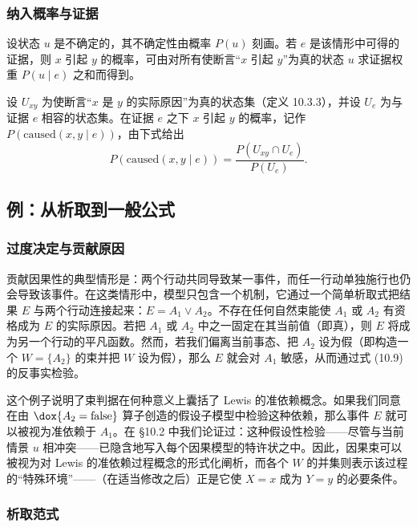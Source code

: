 \subsubsection*{纳入概率与证据}

设状态 $u$ 是不确定的，其不确定性由概率 $P(u)$ 刻画。若 $e$ 是该情形中可得的证据，则 $x$ 引起 $y$ 的概率，可由对所有使断言“$x$ 引起 $y$”为真的状态 $u$ 求证据权重 $P(u\mid e)$ 之和而得到。

\begin{definition}[实际因果性的概率]
设 $U_{xy}$ 为使断言“$x$ 是 $y$ 的实际原因”为真的状态集（定义 10.3.3），并设 $U_e$ 为与证据 $e$ 相容的状态集。在证据 $e$ 之下 $x$ 引起 $y$ 的概率，记作 $P(\mathrm{caused}(x,y\mid e))$，由下式给出
\begin{equation}
P(\mathrm{caused}(x,y\mid e))=\frac{P(U_{xy}\cap U_e)}{P(U_e)}.\tag{10.11}
\end{equation}
\end{definition}

\subsection{例：从析取到一般公式}

\subsubsection*{过度决定与贡献原因}

贡献因果性的典型情形是：两个行动共同导致某一事件，而任一行动单独施行也仍会导致该事件。在这类情形中，模型只包含一个机制，它通过一个简单析取式把结果 $E$ 与两个行动连接起来：$E=A_1\vee A_2$。不存在任何自然束能使 $A_1$ 或 $A_2$ 有资格成为 $E$ 的实际原因。若把 $A_1$ 或 $A_2$ 中之一固定在其当前值（即真），则 $E$ 将成为另一个行动的平凡函数。然而，若我们偏离当前事态、把 $A_2$ 设为假（即构造一个 $W=\{A_2\}$ 的束并把 $W$ 设为假），那么 $E$ 就会对 $A_1$ 敏感，从而通过式 \textup{(10.9)} 的反事实检验。

这个例子说明了束判据在何种意义上囊括了 Lewis 的准依赖概念。如果我们同意在由 $\dox{A_2=\text{false}}$ 算子创造的假设子模型中检验这种依赖，那么事件 $E$ 就可以被视为准依赖于 $A_1$。在 \S 10.2 中我们论证过：这种假设性检验——尽管与当前情景 $u$ 相冲突——已隐含地写入每个因果模型的特许状之中。因此，因果束可以被视为对 Lewis 的准依赖过程概念的形式化阐析，而各个 $W$ 的并集则表示该过程的“特殊环境”——（在适当修改之后）正是它使 $X=x$ 成为 $Y=y$ 的必要条件。

\subsubsection*{析取范式}


